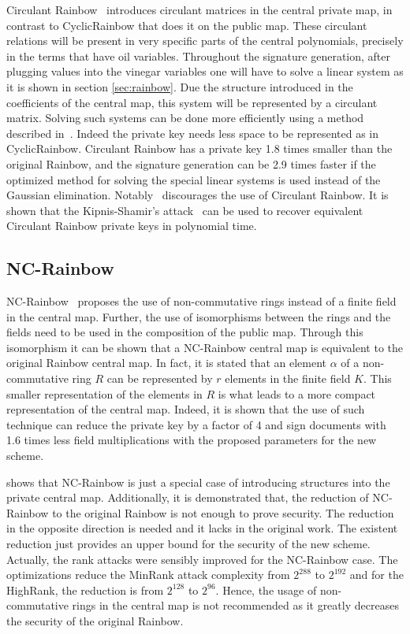 \documentclass{ufsctex/ufsctex}
\begin{document}
Circulant Rainbow~\cite{peng2017circulant} introduces circulant matrices in the
central private map, in contrast to CyclicRainbow that does it on the public
map. These circulant relations will be present in very specific parts of the
central polynomials, precisely in the terms that have oil variables. Throughout
the signature generation, after plugging values into the vinegar variables one
will have to solve a linear system as it is shown in section \ref{sec:rainbow}.
Due the structure introduced in the coefficients of the central map, this
system will be represented by a circulant matrix. Solving such systems can be
done more efficiently using a method described in~\cite{peng2017circulant}.
Indeed the private key needs less space to be represented as in CyclicRainbow.
Circulant Rainbow has a private key 1.8 times smaller than the original
Rainbow, and the signature generation can be 2.9 times faster if the optimized
method for solving the special linear systems is used instead of the Gaussian
elimination. Notably~\cite{hashimoto2018security} discourages the use of
Circulant Rainbow. It is shown that the Kipnis-Shamir's
attack~\cite{kipnis1998cryptanalysis} can be used to recover equivalent
Circulant Rainbow private keys in polynomial time.

\subsection{NC-Rainbow}

NC-Rainbow~\cite{yasuda2012reducing} proposes the use of non-commutative rings
instead of a finite field in the central map. Further, the use of isomorphisms
between the rings and the fields need to be used in the composition of the
public map. Through this isomorphism it can be shown that a NC-Rainbow central
map is equivalent to the original Rainbow central map. In fact, it is stated
that an element $\alpha$ of a non-commutative ring $R$ can be represented by
$r$ elements in the finite field $K$. This smaller representation of the
elements in $R$ is what leads to a more compact representation of the central
map. Indeed, it is shown that the use of such technique can reduce the private
key by a factor of 4 and sign documents with 1.6 times less field
multiplications with the proposed parameters for the new scheme.

\cite{thomae2012quo} shows that NC-Rainbow is just a special case of
introducing structures into the private central map. Additionally, it is
demonstrated that, the reduction of NC-Rainbow to the original Rainbow is not
enough to prove security. The reduction in the opposite direction is needed and
it lacks in the original work. The existent reduction just provides an upper
bound for the security of the new scheme. Actually, the rank attacks were
sensibly improved for the NC-Rainbow case. The optimizations reduce the MinRank
attack complexity from $2^{288}$ to $2^{192}$ and for the HighRank, the
reduction is from $2^{128}$ to $2^{96}$. Hence, the usage of non-commutative
rings in the central map is not recommended as it greatly decreases the
security of the original Rainbow.
\end{document}
